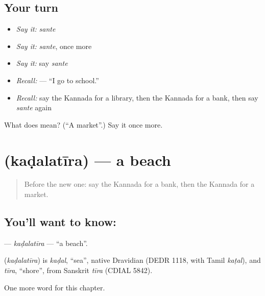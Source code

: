 \subsection*{Your turn}
\begin{itemize}
\raggedright
  \item \emph{Say it:} \emph{sante}
  \item \emph{Say it:} \emph{sante}, once more
  \item \emph{Say it:} say \emph{sante}
  \item \emph{Recall:} \textbf{  } — “I go to school.”
  \item \emph{Recall:} say the Kannada for a library, then the Kannada for a bank, then say \emph{sante} again
\end{itemize}

\begin{tcolorbox}[breakable,colback=teal!4,colframe=teal!35!black,title={Before you move on}]
What does  mean? (\textquotedblleft{}A market\textquotedblright{}.) Say it once more.
\end{tcolorbox}
\section[\texorpdfstring{\kn{ಕಡಲತೀರ} (kaḍalatīra)}{ಕಡಲತೀರ (kaḍalatīra)}]{ (kaḍalatīra) — a beach}

\label{lesson:KA-C110-kadalatira}



\begin{quote}
Before the new one: say the Kannada for a bank, then the Kannada for a market.
\end{quote}

\subsection*{You'll want to know: }
\textbf{} — \emph{kaḍalatīra} — \textquotedblleft{}a beach\textquotedblright{}.

\begin{cousinweb}
\textbf{} (\emph{kaḍalatīra}) is \emph{kaḍal}, \textquotedblleft{}sea\textquotedblright{}, native Dravidian (DEDR 1118, with Tamil \emph{kaṭal}), and \emph{tīra}, \textquotedblleft{}shore\textquotedblright{}, from Sanskrit \emph{tīra} (CDIAL 5842).
\end{cousinweb}

\begin{grammarlens}[title={What you've built}]
One more word for this chapter.
\end{grammarlens}

